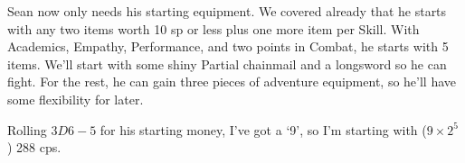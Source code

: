   \begin{exampletext}

    Sean now only needs his starting equipment.
    We covered already that he starts with any two items worth 10 \gls{sp} or less plus one more item per Skill.
    With Academics, Empathy, Performance, and two points in Combat, he starts with 5 items.
    We'll start with some shiny Partial chainmail and a longsword so he can fight.
    For the rest, he can gain three pieces of \gls{adventure} equipment, so he'll have some flexibility for later.

  Rolling $3D6-5$ for his starting money, I've got a `9', so I'm starting with ($9\times 2^5$) 288 \glspl{cp}.

\end{exampletext}
